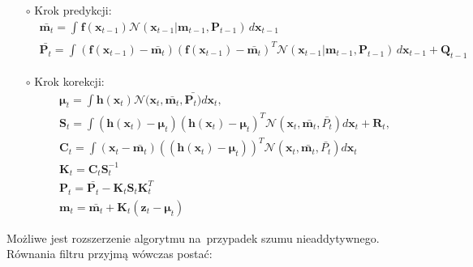 \begin{itemize}
	\item[$\circ$] Krok predykcji:
	\begin{align}\label{eq:GaussianAdditivePredictionStep}
	&\bar{\boldsymbol{m}_{t}} = \int_{}^{}\boldsymbol{f}(\boldsymbol{x}_{t-1})\mathcal{N}(\boldsymbol{x}_{t-1}|\boldsymbol{m}_{t-1}, \boldsymbol{P}_{t-1}) \,d\boldsymbol{x}_{t-1} \nonumber \\
	&\bar{\mathbf{P}_{t}} = \int_{}^{}(\boldsymbol{f}(\boldsymbol{x}_{t-1}) - \bar{ \boldsymbol{m}_{t}})(\boldsymbol{f}(\boldsymbol{x}_{t-1}) - \bar{ \boldsymbol{m}_{t}})^T \mathcal{N}(\boldsymbol{x}_{t-1}|\boldsymbol{m}_{t-1}, \boldsymbol{P}_{t-1}) \,d\boldsymbol{x}_{t-1} + \boldsymbol{Q}_{t-1}
	\end{align}
	\item[$\circ$] Krok korekcji:
	\begin{align} \label{eq:GaussianAdditiveCorrectionStep}
	&\boldsymbol{\mu}_t=\int \boldsymbol{h}(\boldsymbol{x}_{t})\mathcal{N}(\boldsymbol{x}_{t}, \bar{ \boldsymbol{m}_{t}}, \bar{\boldsymbol{P}_{t})}d\boldsymbol{x}_{t}, \nonumber \\
	&\boldsymbol{S}_t=\int (\boldsymbol{h}(\boldsymbol{x}_{t})-\boldsymbol{\mu}_t)(\boldsymbol{h}(\boldsymbol{x}_{t})-\boldsymbol{\mu}_t)^T\mathcal{N}(\boldsymbol{x}_{t}, \bar{\boldsymbol{m}_{t}}, \bar{P_{t}})d\boldsymbol{x}_{t}+\boldsymbol{R}_t, \nonumber \\
	&\boldsymbol{C}_t=\int (\boldsymbol{x}_{t}-\bar{\boldsymbol{m}_t})((\boldsymbol{h}(\boldsymbol{x}_{t})-\boldsymbol{\mu}_t))^T\mathcal{N}(\boldsymbol{x}_{t}, \bar{\boldsymbol{m}_{t}}, \bar{P_{t}})d\boldsymbol{x}_{t}\\
	&\boldsymbol{K}_t=\boldsymbol{C}_t\boldsymbol{S}_t^{-1} \nonumber \\
	&\boldsymbol{P}_t=\bar{\mathbf{P}_{t}} - \boldsymbol{K}_t\boldsymbol{S}_t\boldsymbol{K}_t^T \nonumber \\
	&\boldsymbol{m}_t = \bar{\boldsymbol{m}_t} + \boldsymbol{K}_t(\boldsymbol{z}_t - \boldsymbol{\mu}_t)
	\end{align}
\end{itemize}
Możliwe jest rozszerzenie algorytmu na~przypadek szumu nieaddytywnego. Równania filtru przyjmą wówczas postać:
